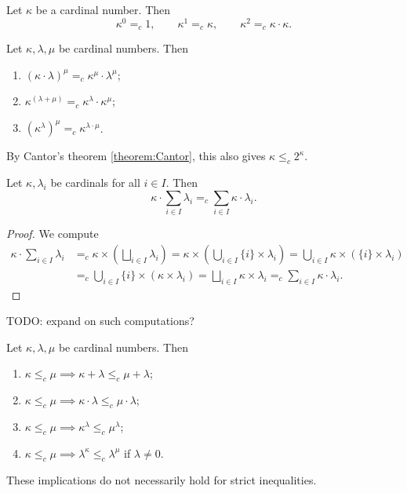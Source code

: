 \begin{lemma}
Let $\kappa$ be a cardinal number. Then
\[ \kappa^0 =_c 1, \qquad \kappa^1 =_c \kappa, \qquad \kappa^2 =_c \kappa\cdot \kappa. \]
\end{lemma}

\begin{lemma}
Let $\kappa,\lambda, \mu$ be cardinal numbers. Then
\begin{enumerate}
\item $(\kappa\cdot\lambda)^\mu =_c \kappa^\mu\cdot\lambda^\mu$;
\item $\kappa^{(\lambda+\mu)} =_c \kappa^\lambda\cdot \kappa^\mu$;
\item $\left(\kappa^\lambda\right)^\mu =_c \kappa^{\lambda\cdot \mu}$.
\end{enumerate}
\end{lemma}
By Cantor's theorem \ref{theorem:Cantor}, this also gives $\kappa \leq_c 2^\kappa$.

\begin{lemma}
Let $\kappa,\lambda_i$ be cardinals for all $i\in I$. Then
\[ \kappa\cdot \sum_{i\in I}\lambda_i =_c \sum_{i\in I}\kappa\cdot \lambda_i. \]
\end{lemma}
\begin{proof}
We compute
\begin{align*}
\kappa\cdot \sum_{i\in I}\lambda_i &=_c \kappa\times\left(\bigsqcup_{i\in I}\lambda_i\right) = \kappa\times \left(\bigcup_{i\in I}\{i\}\times \lambda_i\right) = \bigcup_{i\in I}\kappa\times(\{i\}\times \lambda_i) \\
&=_c \bigcup_{i\in I}\{i\}\times(\kappa\times \lambda_i) = \bigsqcup_{i\in I}\kappa\times \lambda_i =_c \sum_{i\in I}\kappa\cdot \lambda_i.
\end{align*}
\end{proof}
TODO: expand on such computations?

\begin{lemma}
Let $\kappa,\lambda, \mu$ be cardinal numbers. Then
\begin{enumerate}
\item $\kappa\leq_c \mu \implies \kappa+\lambda \leq_c \mu+\lambda$;
\item $\kappa\leq_c \mu \implies \kappa\cdot\lambda \leq_c \mu\cdot\lambda$;
\item $\kappa\leq_c \mu \implies \kappa^\lambda \leq_c \mu^\lambda$;
\item $\kappa\leq_c \mu \implies \lambda^\kappa \leq_c \lambda^\mu$ if $\lambda\neq 0$.
\end{enumerate}
\end{lemma}
These implications do not necessarily hold for strict inequalities.

